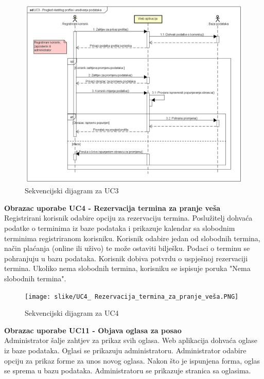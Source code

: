 \begin{figure}[H]
	\includegraphics[scale=0.5]{slike/UC3_Pregled_vlastitog_profila.PNG} %
	\centering
	\caption{Sekvencijski dijagram za UC3}
	\label{fig:promjene}
\end{figure}
\eject

\textbf{Obrazac uporabe UC4 - Rezervacija termina za pranje veša}\\

{Registrirani korisnik odabire opciju za rezervaciju termina. Poslužitelj dohvaća podatke o terminima iz baze podataka i prikazuje kalendar sa slobodnim terminima registriranom korisniku. Korisnik odabire jedan od slobodnih termina, način plaćanja (online ili uživo) te može ostaviti bilješku. Podaci o terminu se pohranjuju u bazu podataka. Korisnik dobiva potvrdu o uspješnoj rezervaciji termina. Ukoliko nema slobodnih termina, korisniku se ispisuje poruka "Nema slobodnih termina".}


\begin{figure}[H]
	\texttt{[image: slike/UC4\_ Rezervacija\_termina\_za\_pranje\_veša.PNG]} %
	\centering
	\caption{Sekvencijski dijagram za UC4}
	\label{fig:promjene}
\end{figure}
\eject


\textbf{Obrazac uporabe UC11 - Objava oglasa za posao} \\

Administrator šalje zahtjev za prikaz svih oglasa. Web aplikacija dohvaća oglase iz baze podataka. Oglasi se prikazuju administratoru. Administrator odabire opciju za prikaz forme za unos novog oglasa. Nakon što je ispunjena forma, oglas se sprema u bazu podataka. Administratoru se prikazuje stranica sa oglasima.

